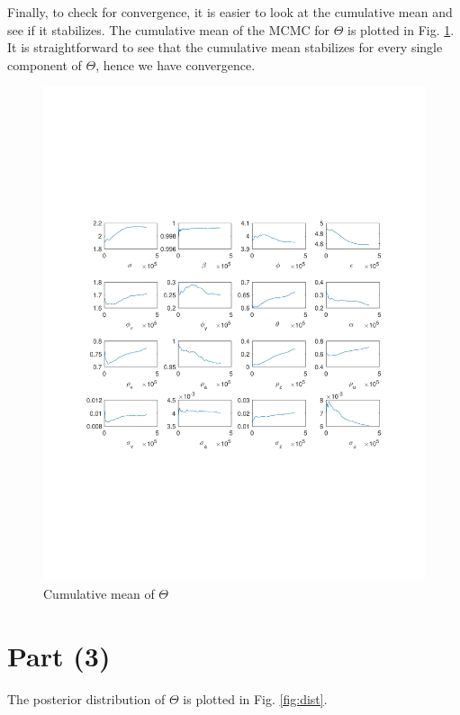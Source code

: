 \documentclass[12pt]{article}
\theoremstyle{definition}
\begin{document}
Finally, to check for convergence, it is easier to look at the cumulative mean and see if it stabilizes. The cumulative mean of the MCMC for $\Theta$ is plotted in Fig. \ref{fig:conv}. It is straightforward to see that the cumulative mean stabilizes for every single component of $\Theta$, hence we have convergence.
\begin{figure}[H]
	\centering
	\includegraphics[width=\linewidth]{conv_MCMC}
	\caption{Cumulative mean of $\Theta$}
	\label{fig:conv}
\end{figure}


\section*{Part (3)}
The posterior distribution of $\Theta$ is plotted in Fig. \ref{fig:dist}.
\end{document}

